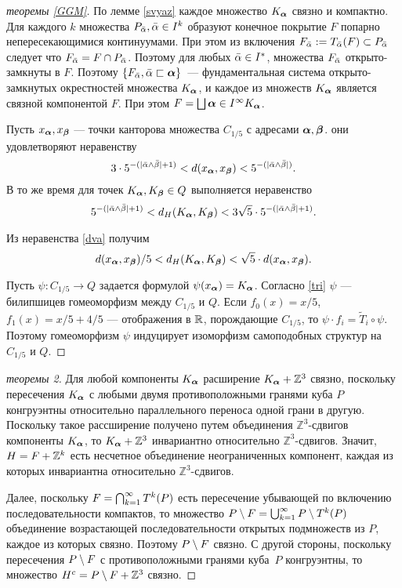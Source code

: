 \begin{proof}[теоремы \ref{GGM}]
По лемме \ref{svyaz} каждое множество $K_{\bm{\alpha}}$ связно и компактно. Для каждого $k$ множества $P_{\bar{\alpha}}, \bar{\alpha}\in I^k$ образуют конечное покрытие $F$ попарно непересекающимися континуумами. При этом из включения $F_{\bar{\alpha}}:=T_{\bar{\alpha}}(F)\subset P_{\bar{\alpha}}$ следует что $F_{\bar{\alpha}}= F\cap P_{\bar{\alpha}}$. Поэтому для любых ${\bar{\alpha}}\in I^*$,
 множества $F_{\bar{\alpha}}$ открыто-замкнуты в $F$. Поэтому  $\{F_{\bar{\alpha}},{\bar{\alpha}}\sqsubset{\bm{\alpha}}\}$~--- фундаментальная система открыто-замкнутых окрестностей множества $K_{\bm{\alpha}}$, и каждое из множеств
$K_{\bm{\alpha}}$ является связной компонентой $F$. При этом $F=\bigsqcup\limits{{\bm{\alpha}}\in I^\infty}K_{\bm{\alpha}}$.

Пусть $x_{\bm{\alpha}}, x_{\bm{\beta}}$ --- точки канторова множества $C_{1/5}$ с адресами ${\bm{\alpha}}, {\bm{\beta}}$. они удовлетворяют неравенству
$$3\cdot5^{-(|\bar{\alpha}\wedge\bar{\beta}|+1)}<d(x_{\bm{\alpha}}, x_{\bm{\beta}})<5^{-(|\bar{\alpha}\wedge\bar{\beta}|)}.$$
В то же время для точек $K_{{\bm{\alpha}}},K_{{\bm{\beta}}}\in Q$ выполняется неравенство
\begin{equation}\label{dva} 5^{-(|\bar{\alpha}\wedge\bar{\beta}|+1)}<d_H(K_{{\bm{\alpha}}},K_{{\bm{\beta}}})< 3\sqrt5\cdot 5^{-(|\bar{\alpha}\wedge\bar{\beta}|+1)}.
\end{equation}

Из неравенства \eqref{dva} получим
\begin{equation}\label{tri} 
d(x_{\bm{\alpha}}, x_{\bm{\beta}})/5<d_H(K_{{\bm{\alpha}}},K_{{\bm{\beta}}})< \sqrt5\cdot d(x_{\bm{\alpha}}, x_{\bm{\beta}}).
\end{equation}

Пусть $\psi:C_{1/5}\to Q$  задается формулой $\psi(x_{\bm{\alpha}})=K_{\bm{\alpha}}$. Согласно \eqref{tri}  $\psi$  --- билипшицев гомеоморфизм между $C_{1/5}$ и $Q$. Если $f_0(x)=x/5$, $f_1(x)=x/5+4/5$  --- отображения в $\mathbb{R}$, порождающие $C_{1/5}$, то $\psi\cdot f_i=\tilde T_i\circ\psi$. Поэтому гомеоморфизм $\psi$ индуцирует изоморфизм самоподобных структур на $C_{1/5}$ и $Q$. 
\end{proof}

\begin{proof}[теоремы 2]
Для любой компоненты $K_{\bm{\alpha}}$ расширение $K_{\bm{\alpha}}+\mathbb{Z}^3$ связно, поскольку  пересечения $K_{\bm{\alpha}}$ с любыми двумя противоположными гранями куба $P$ конгруэнтны относительно параллельного переноса одной грани в другую. Поскольку такое рассширение получено путем объединения $\mathbb{Z}^3$-сдвигов компоненты $K_{\bm{\alpha}}$, то $K_{\bm{\alpha}}+\mathbb{Z}^3$ инвариантно относительно $\mathbb{Z}^3$-сдвигов. Значит, $H=F+\mathbb{Z}^k$ есть несчетное объединение неограниченных компонент, каждая из которых инвариантна относительно $\mathbb{Z}^3$-сдвигов.

Далее, поскольку $F=\bigcap_{k=1}^\infty T^k(P)$ есть пересечение убывающей по включению последовательности компактов, то множество $P\setminus F=\bigcup_{k=1}^\infty P\setminus T^k(P)$ объединение возрастающей последовательности открытых подмножеств из $P$, каждое из которых связно. Поэтому $P\setminus F$ связно. С другой стороны, поскольку пересечения $P\setminus F$ с противоположными гранями куба~$P$ конгруэнтны, то множество $H^c=P\setminus F +\mathbb{Z}^3$ связно. 
\end{proof}

